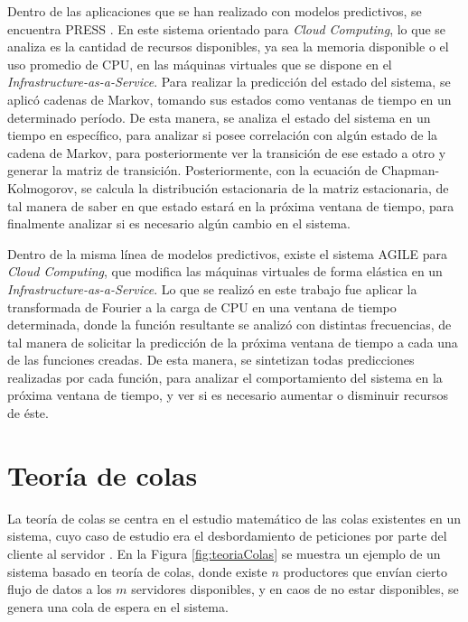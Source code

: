 Dentro de las aplicaciones que se han realizado con modelos predictivos, se encuentra PRESS \citep{GongGW10}. En este sistema orientado para \textit{Cloud Computing}, lo que se analiza es la cantidad de recursos disponibles, ya sea la memoria disponible o el uso promedio de CPU, en las máquinas virtuales que se dispone en el \textit{Infrastructure-as-a-Service}. Para realizar la predicción del estado del sistema, se aplicó cadenas de Markov, tomando sus estados como ventanas de tiempo en un determinado período. De esta manera, se analiza el estado del sistema en un tiempo en específico, para analizar si posee correlación con algún estado de la cadena de Markov, para posteriormente ver la transición de ese estado a otro y generar la matriz de transición. Posteriormente, con la ecuación de Chapman-Kolmogorov, se calcula la distribución estacionaria de la matriz estacionaria, de tal manera de saber en que estado estará en la próxima ventana de tiempo, para finalmente analizar si es necesario algún cambio en el sistema.

Dentro de la misma línea de modelos predictivos, existe el sistema AGILE \citep{NguyenSGSW13} para \textit{Cloud Computing}, que modifica las máquinas virtuales de forma elástica en un \textit{Infrastructure-as-a-Service}. Lo que se realizó en este trabajo fue aplicar la transformada de Fourier \citep{falk2012first} a la carga de CPU en una ventana de tiempo determinada, donde la función resultante se analizó con distintas frecuencias, de tal manera de solicitar la predicción de la próxima ventana de tiempo a cada una de las funciones creadas. De esta manera, se sintetizan todas predicciones realizadas por cada función, para analizar el comportamiento del sistema en la próxima ventana de tiempo, y ver si es necesario aumentar o disminuir recursos de éste.

\section{Teoría de colas}
\label{sec:teoriaColas}

La teoría de colas se centra en el estudio matemático de las colas existentes en un sistema, cuyo caso de estudio era el desbordamiento de peticiones por parte del cliente al servidor \citep{queueingtheory}. En la Figura \ref{fig:teoriaColas} se muestra un ejemplo de un sistema basado en teoría de colas, donde existe $n$ productores que envían cierto flujo de datos a los $m$ servidores disponibles, y en caos de no estar disponibles, se genera una cola de espera en el sistema.

